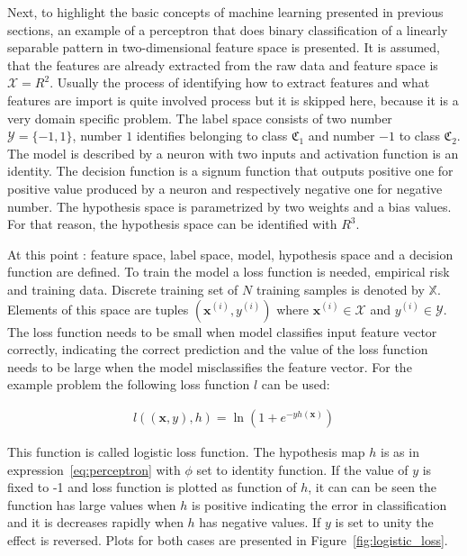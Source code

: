 \documentclass[english, 12pt, a4paper, elec, utf8, online]{aaltothesis}
\begin{document}
Next, to highlight the basic concepts of machine learning presented in previous sections, an example of a perceptron that does binary classification of a linearly separable pattern in two-dimensional feature space is presented. It is assumed, that the features are already extracted from the raw data and feature space is $\mathcal{X} = R^2$. Usually the process of identifying how to extract features and what features are import is quite involved process but it is skipped here, because it is a very domain specific problem. The label space consists of two number $\mathcal{Y} = \{-1, 1\}$, number $1$ identifies belonging to class $\mathfrak{C_{1}}$ and number $-1$ to class $\mathfrak{C_{2}}$. The model is described by a neuron with two inputs and activation function is an identity. The decision function is a signum function that outputs positive one for positive value produced by a neuron and respectively negative one for negative number. The hypothesis space is parametrized by two weights and a bias values. For that reason, the hypothesis space can be identified with $R^3$.  

At this point : feature space, label space, model, hypothesis space and a decision function are defined. To train the model a loss function is needed, empirical risk and training data. Discrete training set of $N$ training samples is denoted by $\mathbb{X}$. Elements of this space are tuples $(\mathbf{x}^{(i)}, y^{(i)})$ where $ \mathbf{x}^{(i)} \in \mathcal{X}$ and $ y^{(i)} \in \mathcal{Y}$. The loss function needs to be small when model classifies input feature vector correctly, indicating the correct prediction and the value of the loss function needs to be large when the model misclassifies the feature vector. For the example problem the following loss function $l$ can be used:

\begin{align}\label{eq:logistic_loss}
l((\mathbf{x},y),h) = \ln{(1+e^{-yh(\mathbf{x})})}
\end{align}

This function is called logistic loss function. The hypothesis map $h$ is as in expression~\ref{eq:perceptron} with $\phi$ set to identity function. If the value of $y$ is fixed to -1 and loss function is plotted as function of $h$, it can can be seen the function has large values when $h$ is positive indicating the error in classification and it is decreases rapidly when $h$ has negative values. If $y$ is set to unity the effect is reversed. Plots for both cases are presented in Figure~\ref{fig:logistic_loss}.
 
\end{document}
